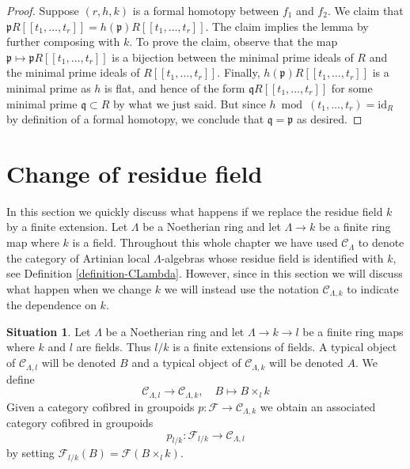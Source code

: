 \documentclass{stacks-project}
\theoremstyle{plain}
\theoremstyle{definition}
\newtheorem{situation}[subsection]{Situation}
\theoremstyle{remark}
\numberwithin{equation}{subsection}
\begin{document}
\begin{proof}
Suppose $(r, h, k)$ is a formal homotopy between $f_1$ and $f_2$.
We claim that
$\mathfrak pR[[t_1, \ldots, t_r]] = h(\mathfrak p)R[[t_1, \ldots, t_r]]$.
The claim implies the lemma by further composing with $k$.
To prove the claim, observe that the map
$\mathfrak p \mapsto \mathfrak pR[[t_1, \ldots, t_r]]$
is a bijection between the minimal prime ideals of $R$ and the
minimal prime ideals of $R[[t_1, \ldots, t_r]]$.
Finally, $h(\mathfrak p)R[[t_1, \ldots, t_r]]$ is a minimal
prime as $h$ is flat, and hence of the form
$\mathfrak q R[[t_1, \ldots, t_r]]$ for some minimal
prime $\mathfrak q \subset R$ by what we just said.
But since $h \bmod (t_1, \ldots, t_r) = \text{id}_R$ by
definition of a formal homotopy, we conclude that
$\mathfrak q = \mathfrak p$ as desired.
\end{proof}











\section{Change of residue field}
\label{section-change-of-field}

\noindent
In this section we quickly discuss what happens if we replace the residue
field $k$ by a finite extension. Let $\Lambda$ be a Noetherian ring and
let $\Lambda \to k$ be a finite ring map where $k$ is a field. Throughout
this whole chapter we have used $\mathcal{C}_\Lambda$ to denote the
category of Artinian local $\Lambda$-algebras whose residue field is
identified with $k$, see Definition \ref{definition-CLambda}.
However, since in this section we will discuss what happen when we change
$k$ we will instead use the notation $\mathcal{C}_{\Lambda, k}$ to
indicate the dependence on $k$.

\begin{situation}
\label{situation-change-of-fields}
Let $\Lambda$ be a Noetherian ring and let $\Lambda \to k \to l$ be a finite
ring maps where $k$ and $l$ are fields. Thus $l/k$ is a finite
extensions of fields. A typical object of $\mathcal{C}_{\Lambda, l}$ will be
denoted $B$ and a typical object of $\mathcal{C}_{\Lambda, k}$ will be
denoted $A$. We define
\begin{equation}
\label{equation-comparison}
\mathcal{C}_{\Lambda, l} \longrightarrow \mathcal{C}_{\Lambda, k},
\quad
B \longmapsto B \times_l k
\end{equation}
Given a category cofibred in groupoids
$p : \mathcal{F} \to \mathcal{C}_{\Lambda, k}$ we obtain
an associated category cofibred in groupoids
$$
p_{l/k} : \mathcal{F}_{l/k} \longrightarrow \mathcal{C}_{\Lambda, l}
$$
by setting $\mathcal{F}_{l/k}(B) = \mathcal{F}(B \times_l k)$.
\end{situation}
\end{document}
